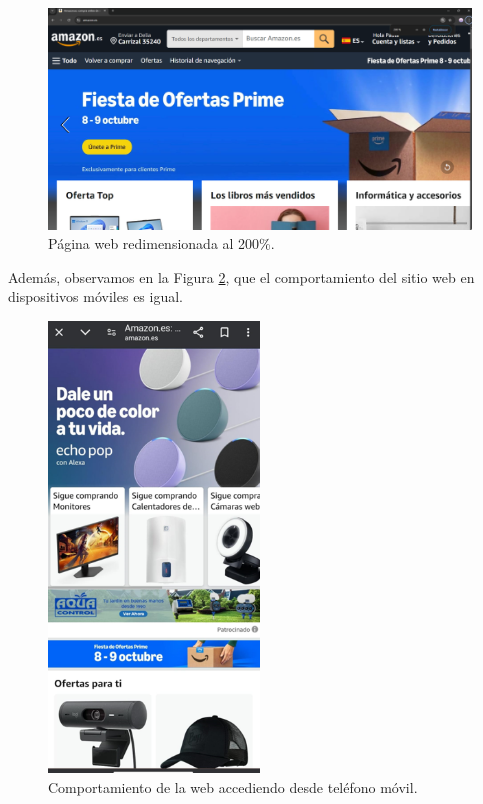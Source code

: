 \documentclass[letterpaper, 12pt]{report}
\begin{document}
\begin{figure}[H]
\centering
\includegraphics[width=1\textwidth]{figure10.png}
\caption{Página web redimensionada al 200\%.}
\label{fig:10}
\end{figure}

Además, observamos en la Figura \ref{fig:11}, que el comportamiento del sitio web en dispositivos móviles es igual.

\begin{figure}[H]
\centering
\includegraphics[width=0.5\textwidth]{figure11.png}
\caption{Comportamiento de la web accediendo desde teléfono móvil.}
\label{fig:11}
\end{figure}
\end{document}
